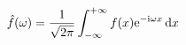 




\[
  \hat{f}(\omega) = \frac{1}{\sqrt{2\mathrm{\pi}}} \int_{-\infty}^{+\infty} f(x) \mathrm{e}^{-\mathrm{i}\omega x} \, \mathrm{d}{x}
\]



